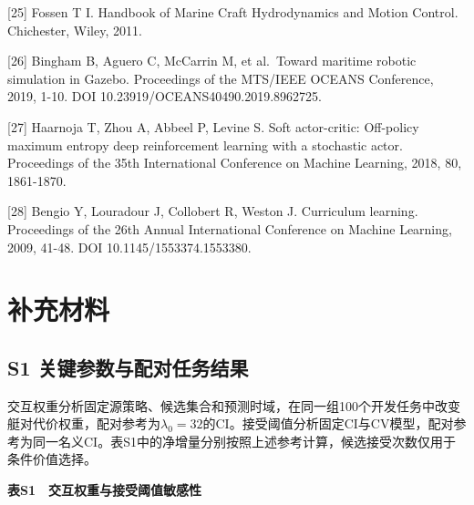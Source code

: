 \documentclass[UTF8,a4paper,zihao=5,fontset=none]{ctexart}
\begin{document}
{[}25{]} Fossen T I. Handbook of Marine Craft Hydrodynamics and Motion
Control. Chichester, Wiley, 2011.

{[}26{]} Bingham B, Aguero C, McCarrin M, et al.~Toward maritime robotic
simulation in Gazebo. Proceedings of the MTS/IEEE OCEANS Conference,
2019, 1-10. DOI 10.23919/OCEANS40490.2019.8962725.

{[}27{]} Haarnoja T, Zhou A, Abbeel P, Levine S. Soft actor-critic:
Off-policy maximum entropy deep reinforcement learning with a stochastic
actor. Proceedings of the 35th International Conference on Machine
Learning, 2018, 80, 1861-1870.

{[}28{]} Bengio Y, Louradour J, Collobert R, Weston J. Curriculum
learning. Proceedings of the 26th Annual International Conference on
Machine Learning, 2009, 41-48. DOI 10.1145/1553374.1553380.

\endgroup\clearpage\section*{补充材料}

\subsection*{S1
关键参数与配对任务结果}

交互权重分析固定源策略、候选集合和预测时域，在同一组100个开发任务中改变艇对代价权重，配对参考为\(\lambda_0=32\)的CI。接受阈值分析固定CI与CV模型，配对参考为同一名义CI。表S1中的净增量分别按照上述参考计算，候选接受次数仅用于条件价值选择。

\begin{center}\small\bfseries 表S1　交互权重与接受阈值敏感性\end{center}
\end{document}
